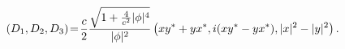 \begin{equation}
 (D_1,D_2,D_3) 
\! = \!
{c \over 2} {\sqrt{1+ {4\over c^2}|\phi|^4} \over |\phi|^2} 
   \left( xy^* + yx^*, i(xy^* - y x^*), |x|^2 - |y|^2 \right) .
\end{equation}

